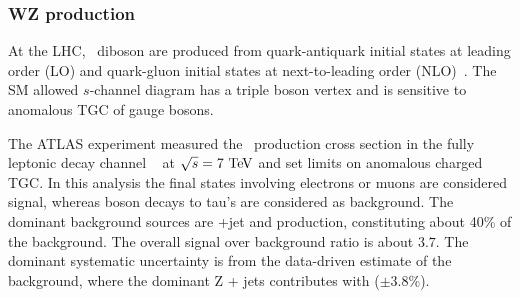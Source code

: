 \subsubsection{WZ production}

\label{sss-WZprod}

At the LHC, \WZ\ diboson are produced from quark-antiquark initial states at 
leading order (LO) and quark-gluon initial states at next-to-leading order 
(NLO)~\cite{PhysRevD.65.094041}. 
The SM allowed $s$-channel diagram has a triple boson vertex and is sensitive to 
anomalous TGC of gauge bosons.





The ATLAS experiment measured the \WZ\ production cross section in the fully 
leptonic decay channel \ll\lnu~\cite{Aad:2012twa} at $\rts = 7\TeV$ and set 
limits on anomalous charged TGC.
In this analysis the final states involving electrons or muons are considered signal,
whereas boson decays to tau's are considered as background.  
The dominant background sources are \Zboson+jet and \ZZ production, constituting about 40\% of 
the background. The overall signal over background ratio is about $3.7$.
The dominant systematic uncertainty is from the data-driven estimate of the   
background, where the dominant Z + jets contributes with ($\pm3.8\%$).

